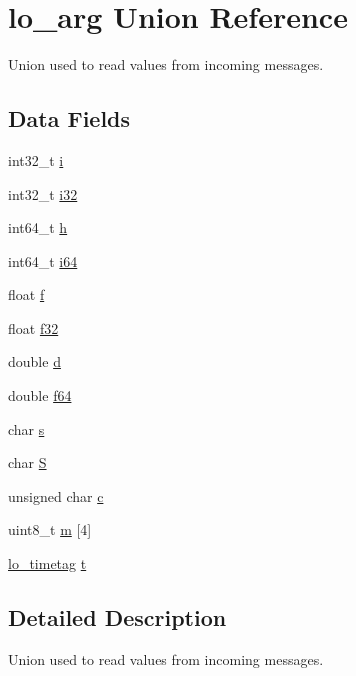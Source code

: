\hypertarget{unionlo__arg}{\section{lo\-\_\-arg \-Union \-Reference}
\label{unionlo__arg}
}


\-Union used to read values from incoming messages.  


\subsection*{\-Data \-Fields}
\begin{DoxyCompactItemize}
\item 
int32\-\_\-t \hyperlink{unionlo__arg_a7eefb9548603ff68b4fbd4c4d41c648b}{i}
\item 
int32\-\_\-t \hyperlink{unionlo__arg_a07e800463dc4ec5066b01033457ca018}{i32}
\item 
int64\-\_\-t \hyperlink{unionlo__arg_a1773bb0e69aa3b137ddc26044334b2b4}{h}
\item 
int64\-\_\-t \hyperlink{unionlo__arg_afe8046a8395e9af51cc759034ccfedd5}{i64}
\item 
float \hyperlink{unionlo__arg_ad61c0f83abb077ce656b3a39d5c7e19f}{f}
\item 
float \hyperlink{unionlo__arg_a27ae2540e5e98e85826ccb7350b2ab20}{f32}
\item 
double \hyperlink{unionlo__arg_a2a690890222baa5b9971f8772cb02535}{d}
\item 
double \hyperlink{unionlo__arg_abf90442900450bb63d8d9bb4e60af4ee}{f64}
\item 
char \hyperlink{unionlo__arg_a15bbcf8284d75ad441b5cde7218548f6}{s}
\item 
char \hyperlink{unionlo__arg_ab9c6a9c09ea094d58f889ed1a5edba0b}{\-S}
\item 
unsigned char \hyperlink{unionlo__arg_aa2e1c99864cf46e6b9cc52fb5cb214fe}{c}
\item 
uint8\-\_\-t \hyperlink{unionlo__arg_a96d32df951c54eaff5dc67fc97a70c83}{m} \mbox{[}4\mbox{]}
\item 
\hyperlink{structlo__timetag}{lo\-\_\-timetag} \hyperlink{unionlo__arg_afc89e5569fba7a660638839366b17408}{t}
\end{DoxyCompactItemize}


\subsection{\-Detailed \-Description}
\-Union used to read values from incoming messages. 

